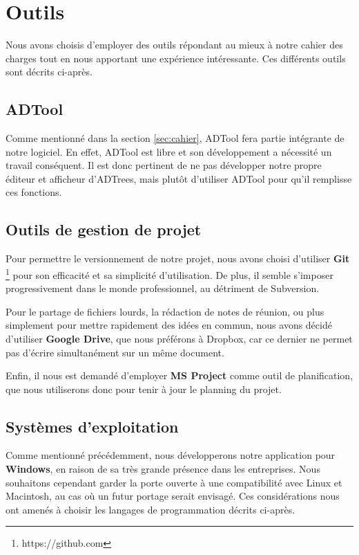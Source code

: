 \section{Outils}
    \label{sec:outils}
    	
		Nous avons choisis d'employer des outils répondant au mieux à notre cahier des charges tout en nous apportant une expérience intéressante.  Ces différents outils sont décrits ci-après.
    	
    \subsection{ADTool}
    	Comme mentionné dans la section \ref{sec:cahier}, ADTool fera partie intégrante de notre logiciel. En effet, ADTool est libre et son développement a nécessité un travail conséquent. Il est donc pertinent de ne pas développer notre propre éditeur et afficheur d'ADTrees, mais plutôt d'utiliser ADTool pour qu'il remplisse ces fonctions.
    
         
    \subsection{Outils de gestion de projet}
        Pour permettre le versionnement de notre projet, nous avons choisi d'utiliser {\bf Git} \footnote{https://github.com} pour son efficacité et sa simplicité d'utilisation. De plus, il semble s'imposer progressivement dans le monde professionnel, au détriment de Subversion.
        
        Pour le partage de fichiers lourds, la rédaction de notes de réunion, ou plus simplement pour mettre rapidement des idées en commun, nous avons décidé d'utiliser {\bf Google Drive}, que nous préférons à Dropbox, car ce dernier ne permet pas d'écrire simultanément sur un même document.

        Enfin, il nous est demandé d'employer {\bf MS Project} comme outil de planification, que nous utiliserons donc pour tenir à jour le planning du projet.

	\subsection{Systèmes d'exploitation}
	   Comme mentionné précédemment, nous développerons notre application pour {\bf Windows}, en raison de sa très grande présence dans les entreprises. Nous souhaitons cependant garder la porte ouverte à une compatibilité avec Linux et Macintosh, au cas où un futur portage serait envisagé. Ces considérations nous ont amenés à choisir les langages de programmation décrits ci-après.
	
